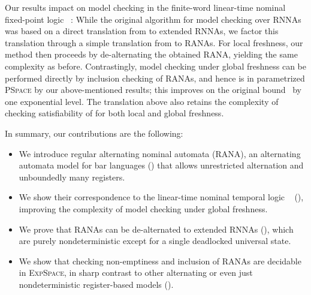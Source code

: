 \documentclass[10pt,a4paper]{amsart}
\providecommand{\IEEEpubidadjcol}{}
\theoremstyle{definition}
\renewcommand{\textsf}[1]{{\oldtextsf{\small#1}}}
\newcommand{\muBar}{\mbox{\textsf{Bar-$\mu$TL}}\xspace}
\newcommand{\PSPACE}{\textsc{PSpace}\xspace}
\newcommand{\EXPSPACE}{\textsc{ExpSpace}\xspace}
\begin{document}
Our results impact on model checking in the finite-word linear-time nominal
fixed-point logic \muBar~\cite{hms21}: While the original algorithm for model checking \muBar
over RNNAs was based on a direct translation from \muBar to extended
RNNAs, we factor this translation through a simple translation from
\muBar to RANAs. For local freshness, our method then proceeds by
de-alternating the obtained RANA, yielding the same complexity as
before. Contrastingly, model checking under global freshness can be
performed directly by inclusion checking of RANAs, and hence is in
parametrized \PSPACE by our above-mentioned results; this improves on the
original bound~\cite{hms21} by one exponential level.
The translation above also retains the complexity of checking satisfiability 
of \muBar{} for both local and global freshness. %

In summary, our contributions are the following:
\begin{itemize}
\item We introduce regular alternating nominal automata (RANA), an
  alternating automata model for bar languages () that
  allows unrestricted alternation and unboundedly many registers.%
  \item We show their correspondence to the linear-time nominal
    temporal logic \muBar~\cite{hms21} (),
    improving the complexity of model checking under global freshness.
  \item We prove that RANAs can be %
    de-alternated to extended RNNAs (), which are
    purely nondeterministic except for a single deadlocked universal
    state. %
  \item We show that checking non-emptiness and inclusion of RANAs are decidable in
    \EXPSPACE, in sharp contrast to other alternating or even just nondeterministic
    register-based models ().
\end{itemize}


 
\IEEEpubidadjcol{}
\end{document}
